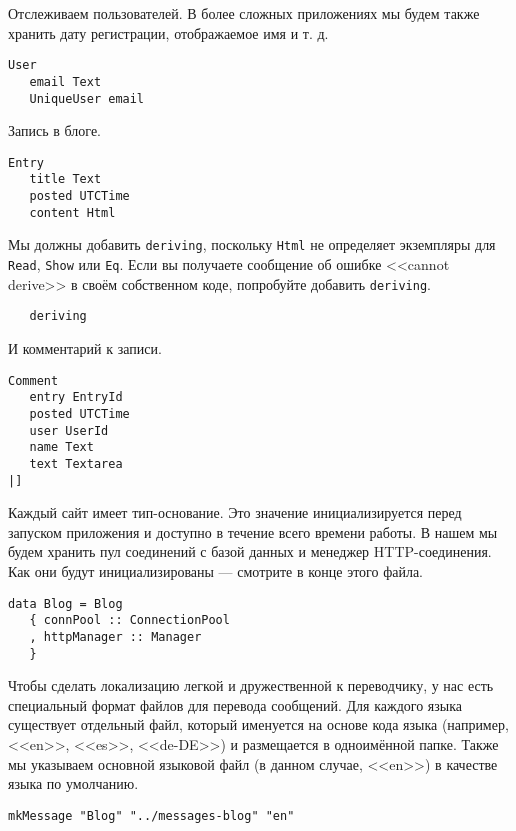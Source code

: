 Отслеживаем пользователей. В более сложных приложениях мы будем также хранить дату регистрации, отображаемое имя и т. д.
 
\begin{lstlisting}
User
   email Text
   UniqueUser email
\end{lstlisting}
 
Запись в блоге. 
 
\begin{lstlisting}
Entry
   title Text
   posted UTCTime
   content Html
\end{lstlisting}
 
Мы должны добавить \lstinline!deriving!, поскольку \lstinline!Html! не определяет экземпляры для \lstinline!Read!, \lstinline!Show! или \lstinline!Eq!. Если вы получаете сообщение об ошибке <<cannot derive>> в своём собственном коде, попробуйте добавить \lstinline!deriving!.
 
\begin{lstlisting}
   deriving
\end{lstlisting}
 
И комментарий к записи. 
 
\begin{lstlisting}
Comment
   entry EntryId
   posted UTCTime
   user UserId
   name Text
   text Textarea
|]
\end{lstlisting}
 
Каждый сайт имеет тип-основание. Это значение инициализируется перед запуском приложения и доступно в течение всего времени работы. В нашем мы будем хранить пул соединений с базой данных и менеджер HTTP-соединения. Как они будут инициализированы --- смотрите в конце этого файла.
 
\begin{lstlisting}
data Blog = Blog
   { connPool :: ConnectionPool
   , httpManager :: Manager
   }
\end{lstlisting}
 
Чтобы сделать локализацию легкой и дружественной к переводчику, у нас есть специальный формат файлов для перевода сообщений. Для каждого языка существует отдельный файл, который именуется на основе кода языка (например, <<en>>, <<es>>, <<de-DE>>) и размещается в одноимённой папке. Также мы указываем основной языковой файл (в данном случае, <<en>>) в качестве языка по умолчанию.
 
\begin{lstlisting}
mkMessage "Blog" "../messages-blog" "en"
\end{lstlisting}
 
